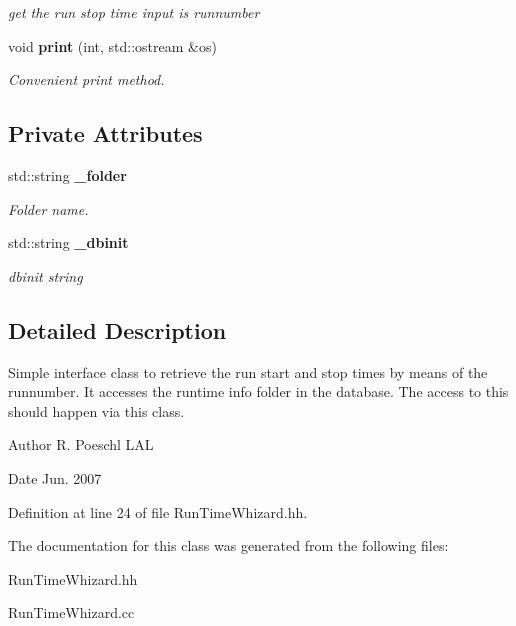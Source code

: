 \begin{DoxyCompactItemize}
\begin{DoxyCompactList}\small\item\em get the run stop time input is runnumber \item\end{DoxyCompactList}\item 
void {\bf print} (int, std::ostream \&os)\label{classCALICE_1_1RunTimeWhizard_a0cba359955aea2f3150d831125d6a89e}

\begin{DoxyCompactList}\small\item\em Convenient print method. \item\end{DoxyCompactList}\end{DoxyCompactItemize}
\subsection*{Private Attributes}
\begin{DoxyCompactItemize}
\item 
std::string {\bf \_\-folder}\label{classCALICE_1_1RunTimeWhizard_ab91fd651f9cd8632b8209b115e5648d0}

\begin{DoxyCompactList}\small\item\em Folder name. \item\end{DoxyCompactList}\item 
std::string {\bf \_\-dbinit}\label{classCALICE_1_1RunTimeWhizard_a5ad19b8ae7c918d6092a929894a66410}

\begin{DoxyCompactList}\small\item\em dbinit string \item\end{DoxyCompactList}\end{DoxyCompactItemize}


\subsection{Detailed Description}
Simple interface class to retrieve the run start and stop times by means of the runnumber. It accesses the runtime info folder in the database. The access to this should happen via this class. 

\begin{DoxyAuthor}{Author}
R. Poeschl LAL 
\end{DoxyAuthor}
\begin{DoxyDate}{Date}
Jun. 2007 
\end{DoxyDate}


Definition at line 24 of file RunTimeWhizard.hh.

The documentation for this class was generated from the following files:\begin{DoxyCompactItemize}
\item 
RunTimeWhizard.hh\item 
RunTimeWhizard.cc\end{DoxyCompactItemize}
